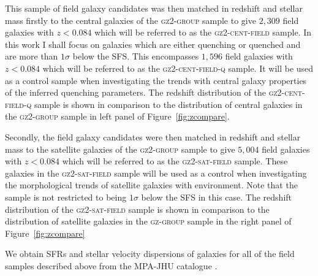This sample of field galaxy candidates was then matched in redshift and stellar mass firstly to the central galaxies of the \textsc{gz2-group} sample to give $2,309$ field galaxies with $z < 0.084$ which will be referred to as the \textsc{gz2-cent-field} sample. In this work I shall focus on galaxies which are either quenching or quenched and are more than $1\sigma$ below the SFS. This encompasses $1,596$ field galaxies with $z < 0.084$ which will be referred to as the \textsc{gz2-cent-field-q} sample. It will be used as a control sample when investigating the trends with central galaxy properties of the inferred quenching parameters. The redshift distribution of the \textsc{gz2-cent-field-q} sample is shown in comparison to the distribution of central galaxies in the \textsc{gz2-group} sample in left panel of Figure~\ref{fig:zcompare}. %

Secondly, the field galaxy candidates were then matched in redshift and stellar mass to the satellite galaxies of the \textsc{gz2-group} sample to give $5, 004$ field galaxies with $z < 0.084$ which will be referred to as the \textsc{gz2-sat-field} sample. These galaxies in the \textsc{gz2-sat-field} sample will be used as a control when investigating the morphological trends of satellite galaxies with environment. Note that the sample is not restricted to being $1\sigma$ below the SFS in this case. The redshift distribution of the \textsc{gz2-sat-field} sample is shown in comparison to the distribution of satellite galaxies in the \textsc{gz-group} sample in the right panel of Figure~\ref{fig:zcompare}

We obtain SFRs and stellar velocity dispersions of galaxies for all of the field samples described above from the MPA-JHU catalogue \citep{kauffmann03, brinchmann04}. 

